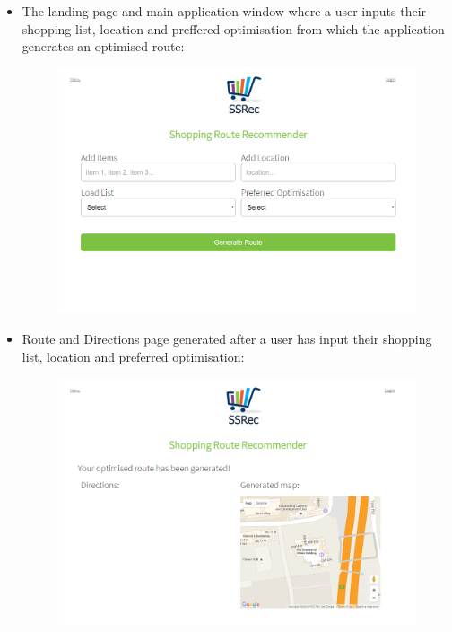 \documentclass[10pt, a4paper, onecolumn]{scrartcl}
\begin{document}
\begin{itemize}
					\item The landing page and main application window where a user inputs their shopping list, location and preffered optimisation from which the application generates an optimised route:
					\begin{figure}[h!]
						\centering
						\includegraphics[scale = 0.5]{Images/index.png}
						\label{menu}
					\end{figure}
					
					\item Route and Directions page generated after a user has input their shopping list, location and preferred optimisation:
					\begin{figure}[h!]
						\centering
						\includegraphics[scale = 0.5]{Images/routeGen.png}
						\label{menu}
					\end{figure}
					

\end{itemize}
\end{document}

